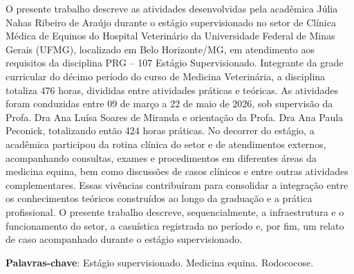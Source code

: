 \begin{resumo}

O presente trabalho descreve as atividades desenvolvidas pela acadêmica
Júlia Nahas Ribeiro de Araújo durante o estágio supervisionado no setor
de Clínica Médica de Equinos do Hospital Veterinário da Universidade
Federal de Minas Gerais (UFMG), localizado em Belo Horizonte/MG, em
atendimento aos requisitos da disciplina PRG -- 107 Estágio
Supervisionado. Integrante da grade curricular do décimo período do
curso de Medicina Veterinária, a disciplina totaliza 476 horas,
divididas entre atividades práticas e teóricas. As atividades foram
conduzidas entre 09 de março a 22 de maio de 2026, sob supervisão da
Profa. Dra Ana Luísa Soares de Miranda e orientação da Profa. Dra Ana
Paula Peconick, totalizando então 424 horas práticas. No decorrer do
estágio, a acadêmica participou da rotina clínica do setor e de
atendimentos externos, acompanhando consultas, exames e procedimentos em
diferentes áreas da medicina equina, bem como discussões de casos
clínicos e entre outras atividades complementares. Essas vivências
contribuíram para consolidar a integração entre os conhecimentos
teóricos construídos ao longo da graduação e a prática profissional. O
presente trabalho descreve, sequencialmente, a infraestrutura e o
funcionamento do setor, a casuística registrada no período e, por fim,
um relato de caso acompanhado durante o estágio supervisionado.

\vspace{\onelineskip}

\noindent
\textbf{Palavras-chave}: Estágio supervisionado. Medicina equina. Rodococose.

\end{resumo}
